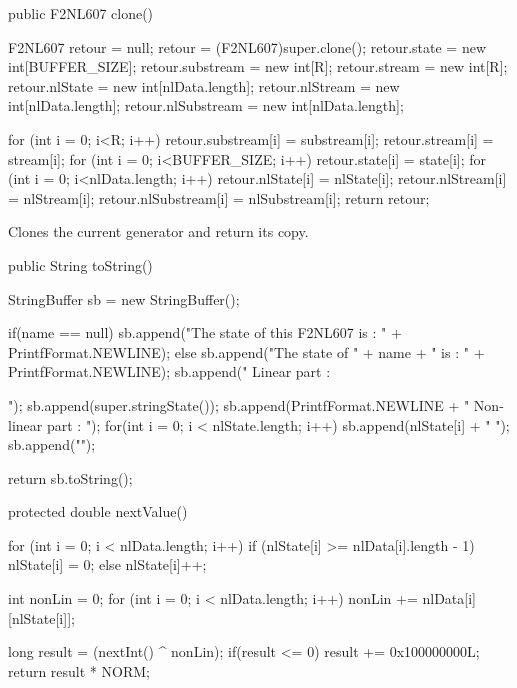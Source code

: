 \begin{code}

   public F2NL607 clone() \begin{hide} {
      F2NL607 retour = null;
      retour = (F2NL607)super.clone();
      retour.state = new int[BUFFER_SIZE];
      retour.substream = new int[R];
      retour.stream = new int[R];
      retour.nlState = new int[nlData.length];
      retour.nlStream = new int[nlData.length];
      retour.nlSubstream = new int[nlData.length];

      for (int i = 0; i<R; i++) {
         retour.substream[i] = substream[i];
         retour.stream[i] = stream[i];
      }
      for (int i = 0; i<BUFFER_SIZE; i++) {
         retour.state[i] = state[i];
      }
      for (int i = 0; i<nlData.length; i++) {
         retour.nlState[i] = nlState[i];
         retour.nlStream[i] = nlStream[i];
         retour.nlSubstream[i] = nlSubstream[i];
      }
      return retour;
   }\end{hide}
\end{code}
 \begin{tabb} Clones the current generator and return its copy.
 \end{tabb}
 \begin{htmlonly}
\end{htmlonly}
\begin{code}
\begin{hide}
   public String toString() {
      StringBuffer sb = new StringBuffer();

      if(name == null)
         sb.append("The state of this F2NL607 is : " + PrintfFormat.NEWLINE);
      else
         sb.append("The state of " + name + " is : " + PrintfFormat.NEWLINE);
      sb.append(" Linear part : { ");
      sb.append(super.stringState());
      sb.append(PrintfFormat.NEWLINE + " Non-linear part : { ");
      for(int i = 0; i < nlState.length; i++)
         sb.append(nlState[i] + " ");
      sb.append("}");

      return sb.toString();
   }



   protected double nextValue() {
      for (int i = 0; i < nlData.length; i++)
         if (nlState[i] >= nlData[i].length - 1)
            nlState[i] = 0;
         else
            nlState[i]++;

      int nonLin = 0;
      for (int i = 0; i < nlData.length; i++)
         nonLin += nlData[i][nlState[i]];

      long result = (nextInt() ^ nonLin);
      if(result <= 0)
         result += 0x100000000L;
      return result * NORM;
   }
}
\end{hide}
\end{code}

